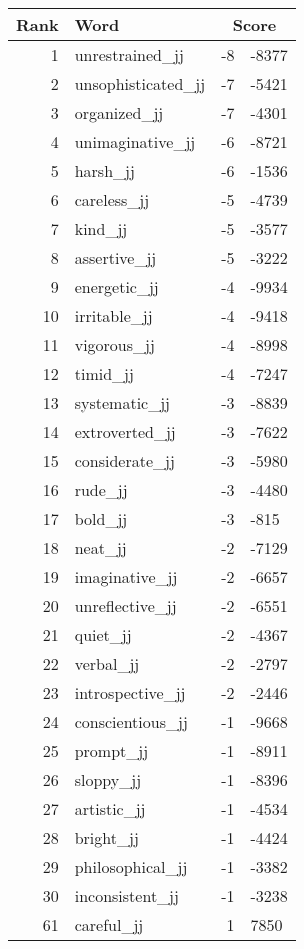 \begin{longtable}[!htbp]{| rlr@{.}l |}
    \hline
    \textbf{Rank} & \textbf{Word} & \multicolumn{2}{c|}{\textbf{Score}} \\
    \hline
    \endhead
    1 & unrestrained\_jj & -8 & -8377 \\
    2 & unsophisticated\_jj & -7 & -5421 \\
    3 & organized\_jj & -7 & -4301 \\
    4 & unimaginative\_jj & -6 & -8721 \\
    5 & harsh\_jj & -6 & -1536 \\
    6 & careless\_jj & -5 & -4739 \\
    7 & kind\_jj & -5 & -3577 \\
    8 & assertive\_jj & -5 & -3222 \\
    9 & energetic\_jj & -4 & -9934 \\
    10 & irritable\_jj & -4 & -9418 \\
    11 & vigorous\_jj & -4 & -8998 \\
    12 & timid\_jj & -4 & -7247 \\
    13 & systematic\_jj & -3 & -8839 \\
    14 & extroverted\_jj & -3 & -7622 \\
    15 & considerate\_jj & -3 & -5980 \\
    16 & rude\_jj & -3 & -4480 \\
    17 & bold\_jj & -3 & -815 \\
    18 & neat\_jj & -2 & -7129 \\
    19 & imaginative\_jj & -2 & -6657 \\
    20 & unreflective\_jj & -2 & -6551 \\
    21 & quiet\_jj & -2 & -4367 \\
    22 & verbal\_jj & -2 & -2797 \\
    23 & introspective\_jj & -2 & -2446 \\
    24 & conscientious\_jj & -1 & -9668 \\
    25 & prompt\_jj & -1 & -8911 \\
    26 & sloppy\_jj & -1 & -8396 \\
    27 & artistic\_jj & -1 & -4534 \\
    28 & bright\_jj & -1 & -4424 \\
    29 & philosophical\_jj & -1 & -3382 \\
    30 & inconsistent\_jj & -1 & -3238 \\
    61 & careful\_jj & 1 & 7850 \\

\end{longtable}
